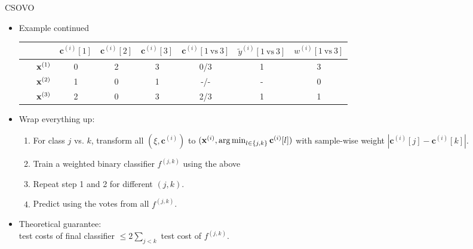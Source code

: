 \documentclass[11pt,compress,t,notes=noshow, xcolor=table]{beamer}
\newcommand{\cv}{\mathbf{c}}    %
\begin{document}
\begin{vbframe}{CSOVO}
    \begin{itemize}
    \item Example continued
            \begin{center}  
            \footnotesize{
        \begin{tabular}{cc|ccc|ccc}\
        			& & $\cv^{(i)}[1]$ & $\cv^{(i)}[2]$ & $\cv^{(i)}[3]$ & $\cv^{(i)}[1 \ \text{vs} \ 3]$ & $\tilde{y}^{( i)}[1 \ \text{vs} \ 3]$ & $w^{(i)}[1 \ \text{vs} \ 3]$\\
        			\hline & $\mathbf{x}^{(1)}$ & 0 & 2 & 3 & 0/3 & 1 & 3\\
        			& $\mathbf{x}^{(2)}$ & 1 & 0 & 1 & -/- & - & 0 \\
                 	& $\mathbf{x}^{(3)}$ & 2 & 0 & 3 & 2/3 & 1 & 1\\
                \end{tabular}
                }
    \end{center}
            \vspace{5pt}

    \item Wrap everything up:
    \begin{enumerate}
        \item For class $j$ vs. $k$, transform all $(\xi, \cv^{(i)})$ to $(\xi, \argmin_{l \in \{j, k\}} \cv^{(i)}[l])$ with sample-wise weight $|\cv^{(i)}[j] - \cv^{(i)}[k]|$.
        \vspace{5pt}
        
        \item Train a weighted binary classifier $f^{(j, k)}$ using the above
        \vspace{5pt}
        
        \item Repeat step 1 and 2 for different $(j, k)$.
        \vspace{5pt}
        
        \item Predict using the votes from all $f^{(j, k)}$.
    \end{enumerate}
    \vspace{5pt}

    \item Theoretical guarantee:\\ 
    test costs of final classifier $\leq 2\sum_{j < k}$ test cost of $f^{(j, k)}$. 
    \end{itemize}
\end{vbframe}
\end{document}
